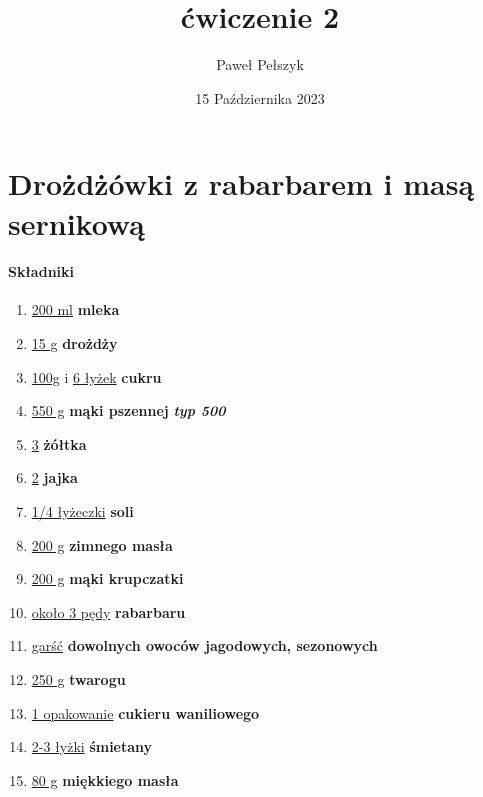 \documentclass[12pt, letterpaper, titlepage]{article}
\title{ćwiczenie 2}
\author{Paweł Pełszyk}
\date{15 Października 2023}
\begin{document}
\maketitle

\section{Drożdżówki z rabarbarem i masą sernikową}

\paragraph{Składniki}
\begin{enumerate}[-]
\item  
\underline{200 ml} 
\textbf{mleka}
\item 
\underline{15 g} 
\textbf{drożdży}
\item 
\underline{100g}
 i
\underline{6 łyżek} 
\textbf{cukru}
\item 
\underline {550 g} 
\textbf{mąki pszennej}
\textit{\textbf{typ 500}}
\item 
\underline{3} \textbf{żółtka}
\item 
\underline{2} \textbf{jajka}
\item 
\underline{1/4 łyżeczki} \textbf{soli}
\item 
\underline{200 g}  \textbf{zimnego masła}
\item 
\underline{200 g} \textbf{mąki krupczatki}
\item 
\underline{około 3 pędy} \textbf{rabarbaru}
\item 
\underline{garść} \textbf{dowolnych owoców jagodowych, sezonowych}
\item 
\underline{250 g} \textbf{twarogu}
\item 
\underline{1 opakowanie} \textbf{cukieru waniliowego}
\item 
\underline{2-3 łyżki} \textbf{śmietany}
\item 
\underline{80 g} \textbf{miękkiego masła}
\end{enumerate}
\end{document}
